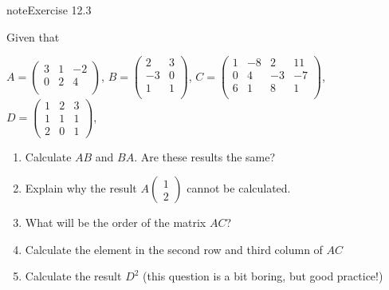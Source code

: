 \documentclass[letterpaper,10pt,english]{jupyterBook}
\begin{document}
\begin{sphinxadmonition}{note}{Exercise 12.3}



\sphinxAtStartPar
Given that

\sphinxAtStartPar
\(A=\left(\begin{array}{ccc}3 & 1 & -2 \\0 & 2 & 4 \\\end{array}\right)\),   \(B=\left(\begin{array}{cc}2 & 3 \\-3 & 0 \\1 & 1 \\\end{array}\right)\),   \(C=\left(\begin{array}{cccc}1 & -8 & 2 & 11 \\0 & 4 & -3 & -7 \\6 & 1 & 8 & 1 \\\end{array}\right)\),    \(D=\left(\begin{array}{ccc}1 & 2 & 3 \\1 & 1 & 1 \\2 & 0 & 1 \end{array}\right)\),
\begin{enumerate}
%
\item {} 
\sphinxAtStartPar
Calculate \(AB\) and \(BA\). Are these results the same?

\item {} 
\sphinxAtStartPar
Explain why the result \(A\left(\begin{array}{c}1\\2\end{array}\right)\) cannot be calculated.

\item {} 
\sphinxAtStartPar
What will be the order of the matrix \(A C\)?

\item {} 
\sphinxAtStartPar
Calculate the element in the second row and third column of \(AC\)

\item {} 
\sphinxAtStartPar
Calculate the result \(D^2\) (this question is a bit boring, but good practice!)

\end{enumerate}
\end{sphinxadmonition}
\end{document}
